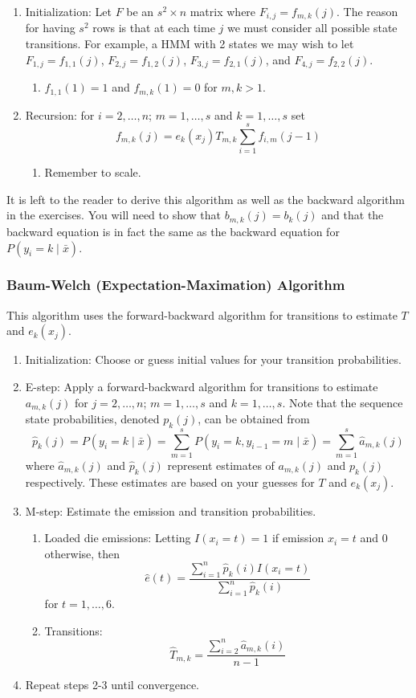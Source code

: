 \documentclass{article}
\numberwithin{equation}{section}
\renewcommand{\P}{P}
\begin{document}
\begin{enumerate}
\item Initialization: Let $F$ be an $s^2\times n$ matrix where
$F_{i,j}=f_{m,k}(j)$.  The reason for having $s^2$ rows is that at
each time $j$ we must consider all possible state transitions.  For
example, a HMM with 2 states we may wish to let
$F_{1,j}=f_{1,1}(j)$, $F_{2,j}=f_{1,2}(j)$, $F_{3,j}=f_{2,1}(j)$,
and $F_{4,j}=f_{2,2}(j)$.
\begin{enumerate}
\item $f_{1,1}(1)=1$ and $f_{m,k}(1)=0$ for $m,k>1$.
\end{enumerate}
\item Recursion: for $i=2,\ldots,n$; $m=1,\ldots,s$ and
$k=1,\ldots,s$ set
\[
f_{m,k}(j)=e_k(x_j)T_{m,k}\sum_{i=1}^s f_{i,m}(j-1)
\]
\begin{enumerate}
\item Remember to scale.
\end{enumerate}
\end{enumerate}

It is left to the reader to derive this algorithm as well as the
backward algorithm in the exercises.  You will need to show that
$b_{m,k}(j)=b_k(j)$ and that the backward equation is in fact the
same as the backward equation for $\P(y_i=k \mid \bar{x})$.

\subsubsection{Baum-Welch (Expectation-Maximation) Algorithm}
This algorithm uses the forward-backward algorithm for transitions
to estimate $T$ and $e_k(x_j)$.

\begin{enumerate}
\item Initialization: Choose or guess initial values for your
transition probabilities.
\item E-step: Apply a forward-backward algorithm for transitions to
estimate $a_{m,k}(j)$ for $j=2,\ldots,n$; $m=1,\ldots,s$ and
$k=1,\ldots,s$.  Note that the sequence state probabilities, denoted
$p_k(j)$, can be obtained from
\[
\hat{p}_k(j)=\P(y_i=k\mid \bar{x})=\sum_{m=1}^s
\P(y_i=k,y_{i-1}=m\mid \bar{x})=\sum_{m=1}^s \hat{a}_{m,k}(j)
\]
where $\hat{a}_{m,k}(j)$ and $\hat{p}_k(j)$ represent estimates of
$a_{m,k}(j)$ and $p_k(j)$ respectively.  These estimates are based
on your guesses for $T$ and $e_k(x_j)$.
\item M-step: Estimate the emission and transition probabilities.
    \begin{enumerate}
    \item Loaded die emissions: Letting $I(x_i=t)=1$ if emission
    $x_i=t$ and 0 otherwise, then
    \[
    \hat{e}(t)=\frac{\sum_{i=1}^n\hat{p}_k(i)I(x_i=t)}{\sum_{i=1}^n\hat{p}_k(i)}
    \]
    for $t=1,\ldots,6$.
    \item Transitions:
    \[
    \hat{T}_{m,k}=\frac{\sum_{i=2}^n\hat{a}_{m,k}(i)}{n-1}
    \]
    \end{enumerate}
\item Repeat steps 2-3 until convergence.
\end{enumerate}
\end{document}
